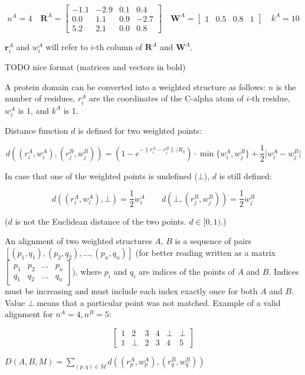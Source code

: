 \documentclass[12pt,draft]{article}
\begin{document}
\[n^A = 4 \quad
\mathbf{R}^A = \begin{bmatrix}-1.1&-2.9&0.1&0.4\\0.0&1.1&0.9&-2.7\\5.2&2.1&0.0&0.8\end{bmatrix} \quad
\mathbf{W}^A = \begin{bmatrix}1&0.5&0.8&1\end{bmatrix} \quad
k^A = 10\]

\(\mathbf{r}^A_i\) and \(w^A_i\) will refer to \(i\)-th column of
\(\mathbf{R}^A\) and \(\mathbf{W}^A\).

TODO nice format (matrices and vectors in bold)

A protein domain can be converted into a weighted structure as follows:
\(n\) is the number of residues, \(r^A_i\) are the coordinates of the
C-alpha atom of \(i\)-th residue, \(w^A_i\) is 1, and \(k^A\) is 1.

Distance function \(d\) is defined for two weighted points:

\[d((r^A_i, w^A_i), (r^B_j, w^B_j)) = \left(1 - e^{-\lVert r^A_i-r^B_j \rVert / R_0}\right) \cdot \min\{ w^A_i, w^B_j \} + \frac{1}{2} \lvert w^A_i-w^B_j \rvert\]

In case that one of the weighted points is undefined (\(\bot\)), \(d\)
is still defined:

\[d((r^A_i, w^A_i), \bot) = \frac{1}{2} w^A_i \qquad d(\bot, (r^B_j, w^B_j)) = \frac{1}{2} w^B_j\]

(\(d\) is not the Euclidean distance of the two points.
\(d \in [0,1)\).)

An alignment of two weighted structures \(A\), \(B\) is a sequence of
pairs \([(p_1, q_1), (p_2, q_2), ..., (p_n, q_n)]\) (for better reading
written as a matrix
\(\begin{bmatrix}p_1&p_2&...&p_n\\q_1&q_2&...&q_n\end{bmatrix}\)), where
\(p_i\) and \(q_i\) are indices of the points of \(A\) and \(B\).
Indices must be increasing and must include each index exactly once for
both \(A\) and \(B\). Value \(\bot\) means that a particular point was
not matched. Example of a valid alignment for \(n^A = 4, n^B = 5\):

\[\begin{bmatrix}1&2&3&4&\bot&\bot\\1&\bot&2&3&4&5\end{bmatrix}\]

\(D(A, B, M) = \sum\limits_{(p, q) \in M}{d((r^A_{p}, w^A_{p}), (r^B_{q}, w^B_{q}))}\)
\end{document}
